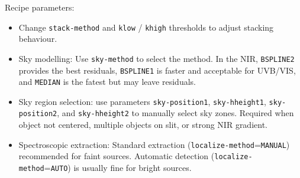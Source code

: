 Recipe parameters:
\begin{itemize}
\item Change {\tt stack-method} and {\tt klow} / {\tt khigh} thresholds to adjust stacking behaviour.
\item Sky modelling: 
Use {\tt sky-method} to select the method. 
In the NIR, {\tt BSPLINE2} provides the best residuals,
{\tt BSPLINE1} is faster and acceptable for UVB/VIS, 
and {\tt MEDIAN} is the fatest but may leave residuals.
\item Sky region selection:
use parameters {\tt sky-position1}, {\tt sky-hheight1}, {\tt sky-position2}, and {\tt sky-hheight2} to manually select sky zones.
Required when object not centered, multiple objects on slit, or strong NIR gradient.
\item Spectroscopic extraction:
Standard extraction 
({\tt localize-method}={\tt MANUAL})
recommended for faint sources.
Automatic detection
({\tt localize-method}={\tt AUTO})
is usually fine for bright sources.
\end{itemize}

